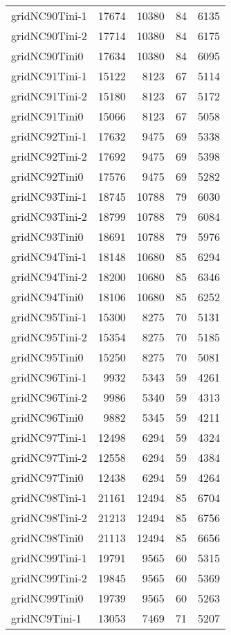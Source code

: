 \documentclass[../../../thesis.tex]{subfiles}
\begin{document}
\begin{longtable}{lrrrr}
gridNC90Tini-1 & 17674 & 10380 & 84 & 6135 \\
gridNC90Tini-2 & 17714 & 10380 & 84 & 6175 \\
gridNC90Tini0 & 17634 & 10380 & 84 & 6095 \\
gridNC91Tini-1 & 15122 & 8123 & 67 & 5114 \\
gridNC91Tini-2 & 15180 & 8123 & 67 & 5172 \\
gridNC91Tini0 & 15066 & 8123 & 67 & 5058 \\
gridNC92Tini-1 & 17632 & 9475 & 69 & 5338 \\
gridNC92Tini-2 & 17692 & 9475 & 69 & 5398 \\
gridNC92Tini0 & 17576 & 9475 & 69 & 5282 \\
gridNC93Tini-1 & 18745 & 10788 & 79 & 6030 \\
gridNC93Tini-2 & 18799 & 10788 & 79 & 6084 \\
gridNC93Tini0 & 18691 & 10788 & 79 & 5976 \\
gridNC94Tini-1 & 18148 & 10680 & 85 & 6294 \\
gridNC94Tini-2 & 18200 & 10680 & 85 & 6346 \\
gridNC94Tini0 & 18106 & 10680 & 85 & 6252 \\
gridNC95Tini-1 & 15300 & 8275 & 70 & 5131 \\
gridNC95Tini-2 & 15354 & 8275 & 70 & 5185 \\
gridNC95Tini0 & 15250 & 8275 & 70 & 5081 \\
gridNC96Tini-1 & 9932 & 5343 & 59 & 4261 \\
gridNC96Tini-2 & 9986 & 5340 & 59 & 4313 \\
gridNC96Tini0 & 9882 & 5345 & 59 & 4211 \\
gridNC97Tini-1 & 12498 & 6294 & 59 & 4324 \\
gridNC97Tini-2 & 12558 & 6294 & 59 & 4384 \\
gridNC97Tini0 & 12438 & 6294 & 59 & 4264 \\
gridNC98Tini-1 & 21161 & 12494 & 85 & 6704 \\
gridNC98Tini-2 & 21213 & 12494 & 85 & 6756 \\
gridNC98Tini0 & 21113 & 12494 & 85 & 6656 \\
gridNC99Tini-1 & 19791 & 9565 & 60 & 5315 \\
gridNC99Tini-2 & 19845 & 9565 & 60 & 5369 \\
gridNC99Tini0 & 19739 & 9565 & 60 & 5263 \\
gridNC9Tini-1 & 13053 & 7469 & 71 & 5207 \\

\end{longtable}
\end{document}
